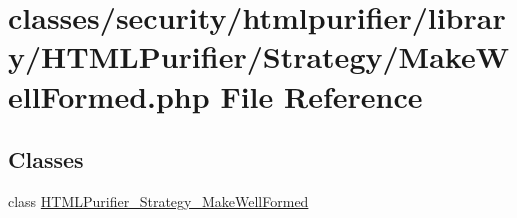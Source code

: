 \hypertarget{MakeWellFormed_8php}{\section{classes/security/htmlpurifier/library/\+H\+T\+M\+L\+Purifier/\+Strategy/\+Make\+Well\+Formed.php File Reference}
\label{MakeWellFormed_8php}
}
\subsection*{Classes}
\begin{DoxyCompactItemize}
\item 
class \hyperlink{classHTMLPurifier__Strategy__MakeWellFormed}{H\+T\+M\+L\+Purifier\+\_\+\+Strategy\+\_\+\+Make\+Well\+Formed}
\end{DoxyCompactItemize}
